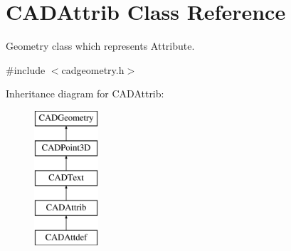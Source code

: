 \hypertarget{class_c_a_d_attrib}{}\section{C\+A\+D\+Attrib Class Reference}
\label{class_c_a_d_attrib}


Geometry class which represents Attribute.  




{\ttfamily \#include $<$cadgeometry.\+h$>$}

Inheritance diagram for C\+A\+D\+Attrib\+:\begin{figure}[H]
\begin{center}
\leavevmode
\includegraphics[height=5.000000cm]{class_c_a_d_attrib}
\end{center}
\end{figure}
